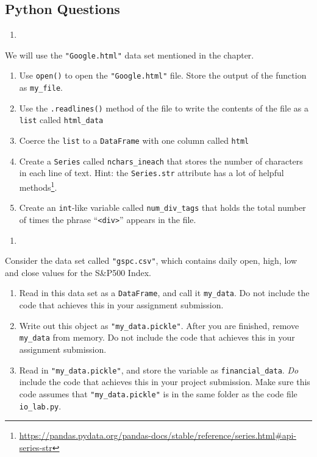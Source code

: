 \documentclass[
  12pt,
  krantz2]{krantz}
\providecommand{\tightlist}{%
  \setlength{\itemsep}{0pt}\setlength{\parskip}{0pt}}
\renewcommand{\href}[2]{#2\footnote{\url{#1}}}
\begin{document}
\hypertarget{python-questions-7}{%
\subsection{Python Questions}\label{python-questions-7}}

\begin{enumerate}
\def\labelenumi{\arabic{enumi}.}
\tightlist
\item
\end{enumerate}

We will use the \texttt{"Google.html"} data set mentioned in the chapter.

\begin{enumerate}
\def\labelenumi{\alph{enumi})}
\tightlist
\item
  Use \texttt{open()} to open the \texttt{"Google.html"} file. Store the output of the function as \texttt{my\_file}.
\item
  Use the \texttt{.readlines()} method of the file to write the contents of the file as a \texttt{list} called \texttt{html\_data}
\item
  Coerce the \texttt{list} to a \texttt{DataFrame} with one column called \texttt{html}
\item
  Create a \texttt{Series} called \texttt{nchars\_ineach} that stores the number of characters in each line of text. Hint: the \href{https://pandas.pydata.org/pandas-docs/stable/reference/series.html\#api-series-str}{\texttt{Series.str} attribute has a lot of helpful methods}.
\item
  Create an \texttt{int}-like variable called \texttt{num\_div\_tags} that holds the total number of times the phrase ``\texttt{\textless{}div\textgreater{}}'' appears in the file.
\end{enumerate}

\begin{enumerate}
\def\labelenumi{\arabic{enumi}.}
\setcounter{enumi}{1}
\tightlist
\item
\end{enumerate}

Consider the data set called \texttt{"gspc.csv"}, which contains daily open, high, low and close values for the S\&P500 Index.

\begin{enumerate}
\def\labelenumi{\alph{enumi})}
\tightlist
\item
  Read in this data set as a \texttt{DataFrame}, and call it \texttt{my\_data}. Do not include the code that achieves this in your assignment submission.
\item
  Write out this object as \texttt{"my\_data.pickle"}. After you are finished, remove \texttt{my\_data} from memory. Do not include the code that achieves this in your assignment submission.
\item
  Read in \texttt{"my\_data.pickle"}, and store the variable as \texttt{financial\_data}. \emph{Do} include the code that achieves this in your project submission. Make sure this code assumes that \texttt{"my\_data.pickle"} is in the same folder as the code file \texttt{io\_lab.py}.
\end{enumerate}
\end{document}
